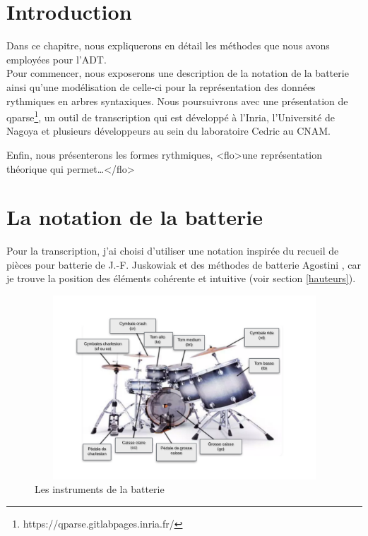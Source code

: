 \section*{Introduction}
Dans ce chapitre, nous expliquerons en détail les méthodes que nous avons
employées pour l’ADT.\\
Pour commencer, nous exposerons une description de la notation de la batterie
ainsi qu’une modélisation de celle-ci pour la représentation des données
rythmiques en arbres syntaxiques. Nous poursuivrons avec une présentation de
qparse\footnote{https://qparse.gitlabpages.inria.fr/}, un outil de
transcription qui est développé à l'Inria, l'Université de Nagoya et plusieurs
développeurs au sein du laboratoire Cedric au CNAM.

Enfin, nous présenterons les formes rythmiques, <flo>une représentation
théorique qui permet…</flo> 

\section{La notation de la batterie}
\label{notation_batterie}
Pour la transcription, j’ai choisi d’utiliser une notation inspirée du recueil
de pièces pour batterie de J.-F. Juskowiak \cite{jusko} et des méthodes de
batterie Agostini \cite{ago_meth_3}, car je trouve la position des éléments
cohérente et intuitive (voir section \ref{hauteurs}).\newpage

\begin{figure}[h]
\centering
\includegraphics[height=69mm, width=115mm]{
z_images/3_methodes/0_notation_de_la_batterie/batterie.png}
\caption{Les instruments de la batterie}
\label{instru_batt}
\end{figure}

